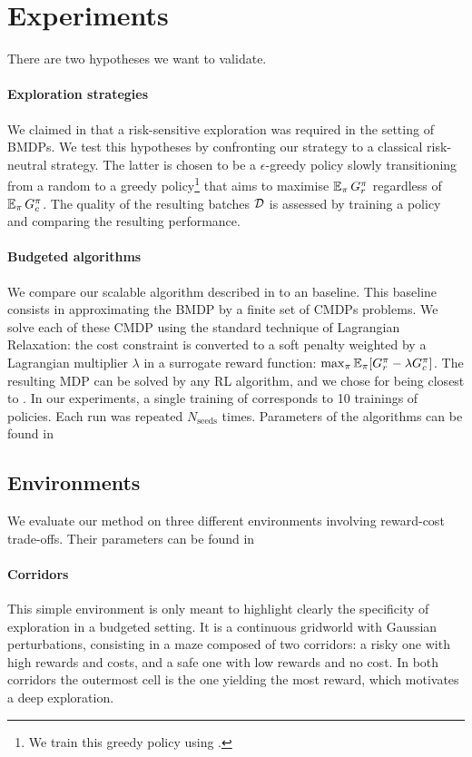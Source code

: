 \documentclass{article}
\begin{document}
\section{Experiments}
\label{sec:experiments}
There are two hypotheses we want to validate.

\paragraph{Exploration strategies}\label{par:ex-explo} We claimed in  that a risk-sensitive exploration was required in the setting of BMDPs. We test this hypotheses by confronting our strategy to a classical risk-neutral strategy. The latter is chosen to be a $\epsilon$-greedy policy slowly transitioning from a random to a greedy policy\footnote{We train this greedy policy using \FTQ.} that aims to maximise $\operatorname*{\mathbb{E}}_{\pi} G_r^\pi$ regardless of $\operatorname*{\mathbb{E}}_{\pi} G_c^\pi$. The quality of the resulting batches $\mathcal{D}$ is assessed by training a \BFTQ policy and comparing the resulting performance.

\paragraph{Budgeted algorithms}\label{par:ex-brl} We compare our  scalable \BFTQ algorithm described in  to an \FTQl baseline. This baseline consists in approximating the BMDP by a finite set of CMDPs problems. We solve each of these CMDP using the standard technique of Lagrangian Relaxation: the cost constraint is converted to a soft penalty weighted by a Lagrangian multiplier $\lambda$ in a surrogate reward function: $\max_{\pi} \operatorname*{\mathbb{E}}_{\pi}[G_r^\pi - \lambda G_c^\pi]$. The resulting MDP can be solved by any RL algorithm, and we chose \FTQ for being closest to \BFTQ.
In our experiments, a single training of \BFTQ corresponds to 10 trainings of \FTQl policies. Each run was repeated $N_{\text{seeds}}$ times. Parameters of the algorithms can be found in 

\subsection{Environments}
\label{subsec:environments}
We evaluate our method on three different environments involving reward-cost trade-offs. Their parameters can be found in 

\paragraph{Corridors}
This simple environment is only meant to highlight clearly the specificity of exploration in a budgeted setting. It is a continuous gridworld with Gaussian perturbations, consisting in a maze composed of two corridors: a risky one with high rewards and costs, and a safe one with low rewards and no cost. In both corridors the outermost cell is the one yielding the most reward, which motivates a deep exploration.
\end{document}

